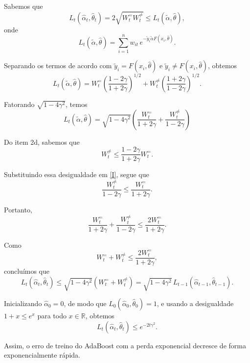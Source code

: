 
Sabemos que
\begin{equation*}
    L_t(\hat{\alpha}_t, \hat{\theta}_t) = 2\sqrt{W_t^= W_t^{\neq}} \le L_t(\tilde{\alpha}, \hat{\theta}),
\end{equation*}
onde
\begin{equation*}
    L_t(\tilde{\alpha}, \hat{\theta}) = \sum_{i=1}^n w_{it} \, e^{-\tilde{y}_i \tilde{\alpha} F(x_i, \hat{\theta})}.
\end{equation*}

Separando os termos de acordo com $\tilde{y}_i = F(x_i, \hat{\theta})$ e $\tilde{y}_i \neq F(x_i, \hat{\theta})$, obtemos
\begin{equation*}
    L_t(\tilde{\alpha}, \hat{\theta}) = W_t^= \left( \frac{1-2\gamma}{1+2\gamma} \right)^{1/2} + W_t^{\neq} \left( \frac{1+2\gamma}{1-2\gamma} \right)^{1/2}.
\end{equation*}

Fatorando $\sqrt{1-4\gamma^2}$, temos
\begin{equation}
    L_t(\tilde{\alpha}, \hat{\theta}) = \sqrt{1-4\gamma^2} \left( \frac{W_t^=}{1+2\gamma} + \frac{W_t^{\neq}}{1-2\gamma} \right) \tag{I}
\end{equation}

Do item 2d, sabemos que
\begin{equation*}
    W_t^{\neq} \le \frac{1-2\gamma}{1+2\gamma} W_t^=.
\end{equation*}

Substituindo essa desigualdade em \eqref{I}, segue que
\begin{equation*}
    \frac{W_t^{\neq}}{1-2\gamma} \le \frac{W_t^=}{1+2\gamma}.
\end{equation*}

Portanto,
\begin{equation*}
    \frac{W_t^=}{1+2\gamma} + \frac{W_t^{\neq}}{1-2\gamma} \le \frac{2 W_t^=}{1+2\gamma}.
\end{equation*}

Como
\begin{equation*}
    W_t^= + W_t^{\neq} \le \frac{2 W_t^=}{1+2\gamma},
\end{equation*}
concluímos que
\begin{equation*}
    L_t(\hat{\alpha}_t, \hat{\theta}_t) \le \sqrt{1-4\gamma^2} \left( W_t^= + W_t^{\neq} \right) = \sqrt{1-4\gamma^2} \, L_{t-1}(\hat{\alpha}_{t-1}, \hat{\theta}_{t-1}).
\end{equation*}

Inicializando $\hat{\alpha}_0 = 0$, de modo que $L_0(\hat{\alpha}_0, \hat{\theta}_0) = 1$, e usando a desigualdade $1+x \le e^x$ para todo $x \in \mathbb{R}$, obtemos
\begin{equation*}
    L_t(\hat{\alpha}_t, \hat{\theta}_t) \le e^{-2 t \gamma^2}.
\end{equation*}

Assim, o erro de treino do AdaBoost com a perda exponencial decresce de forma exponencialmente rápida.